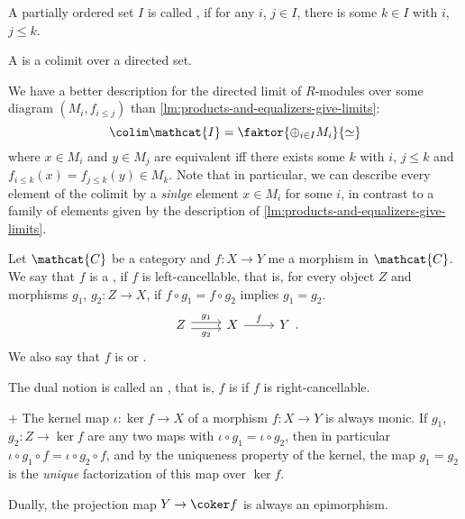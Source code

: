 
\begin{definition}
  A partially ordered set $I$ is called ,
  if for any $i$, $j\in I$, there is some $k\in I$
  with $i$, $j\leq k$.

  A  is a colimit over a directed set. 
\end{definition}

\begin{example}
  \label{ex:directed-limits-in-r-modules}
  We have a better description for the directed limit
  of $R$-modules over some diagram $(M_i, f_{i\leq j})$
  than
  \autoref{lm:products-and-equalizers-give-limits}:
  \[
    \colim \mathcat{I} = \faktor{\oplus_{i \in I} M_i}{\simeq}
  \]
  where $x\in M_i$ and $y\in M_j$ are equivalent iff
  there exists some $k$ with $i$, $j\leq k$ and
  $f_{i\leq k}(x) = f_{j\leq k}(y) \in M_k$.
  Note that in particular, we can describe every element
  of the colimit by a \emph{sinlge} element $x\in M_i$
  for some $i$, in contrast to a family of elements
  given by the description of
  \autoref{lm:products-and-equalizers-give-limits}.
\end{example}

\begin{definition}
  Let $\mathcat{C}$ be a category and $f\colon X\to Y$
  me a morphism in $\mathcat{C}$.
  We say that $f$ is a ,
  if $f$ is left-cancellable, that is,
  for every object $Z$ and morphisms $g_1$, $g_2\colon Z\to X$,
  if $f\circ g_1 = f \circ g_2$ implies $g_1 = g_2$.
  \[
    \begin{tikzcd}
      Z
      \ar[shift left]{r}{g_1}
      \ar[shift right, swap]{r}{g_2}
      &
      X
      \ar{r}{f}
      &
      Y
    \end{tikzcd}
  .\]
  We also say that $f$ is  or .

  The dual notion is called an ,
  that is, $f$ is  if $f$ is right-cancellable. 
\end{definition}

\begin{example}+
  The kernel map $ι\colon \ker f \to X$ of a morphism $f\colon X\to Y$
  is always monic.
  If $g_1$, $g_2\colon Z \to  \ker f$ are any two
  maps with $ι \circ g_1 = ι \circ g_2$,
  then in particular $ι \circ  g_1 \circ  f = ι \circ  g_2 \circ f$,
  and by the uniqueness property of the kernel,
  the map $g_1 = g_2$ is the \emph{unique}
  factorization of this map over $\ker f$.

  Dually, the projection map $Y \to  \coker f$
  is always an epimorphism.
\end{example}

